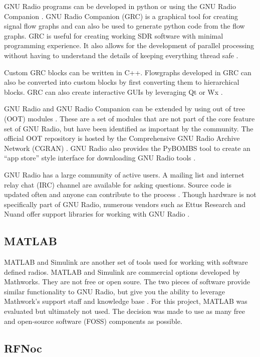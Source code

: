 GNU Radio programs can be developed in python or using the GNU Radio Companion \cite{0023}. GNU Radio Companion (GRC) is a graphical tool for creating signal flow graphs and can also be used to generate python code from the flow graphs. GRC is useful for creating working SDR software with minimal programming experience. It also allows for the development of parallel processing without having to understand the details of keeping everything thread safe \cite{0023}.

Custom GRC blocks can be written in C++. Flowgraphs developed in GRC can also be converted into custom blocks by first converting them to hierarchical blocks. GRC can also create interactive GUIs by leveraging Qt or Wx \cite{0023}. 

GNU Radio and GNU Radio Companion can be extended by using out of tree (OOT) modules \cite{0024}. These are a set of modules that are not part of the core feature set of GNU Radio, but have been identified as important by the community. The official OOT repository is hosted by the Comprehensive GNU Radio Archive Network (CGRAN) \cite{0025}. GNU Radio also provides the PyBOMBS tool to create an ``app store'' style interface for downloading GNU Radio tools \cite{0024}. 

GNU Radio has a large community of active users. A mailing list and internet relay chat (IRC) channel are available for asking questions. Source code is updated often and anyone can contribute to the process \cite{0003}. Though hardware is not specifically part of GNU Radio, numerous vendors such as Ettus Research and Nuand offer support libraries for working with GNU Radio \cite{0026}. 

\subsection{MATLAB}

MATLAB and Simulink are another set of tools used for working with software defined radios. MATLAB and Simulink are commercial options developed by Mathworks. They are not free or open soure. The two pieces of software provide similar functionality to GNU Radio, but give you the ability to leverage Mathwork's support staff and knowledge base \cite{0027}. For this project, MATLAB was evaluated but ultimately not used. The decision was made to use as many free and open-source software (FOSS) components as possible. 

\subsection{RFNoc}


